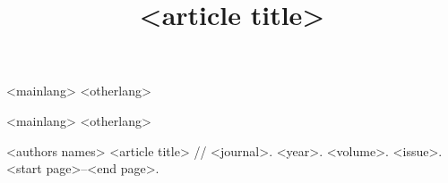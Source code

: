 \documentclass{demi}
\title{<article title>}
\begin{document}
	
\maketitle

\abstracts
{%
	<mainlang>
}%
{%
	<otherlang>
}%

\keywords
{%
	<mainlang>
}%
{%
	<otherlang>
}%


\begin{thebibliography}{10}
	
	 <authors names> <article title> // <journal>. <year>. <volume>. <issue>. <start page>--<end page>.
	
\end{thebibliography}
\end{document}
